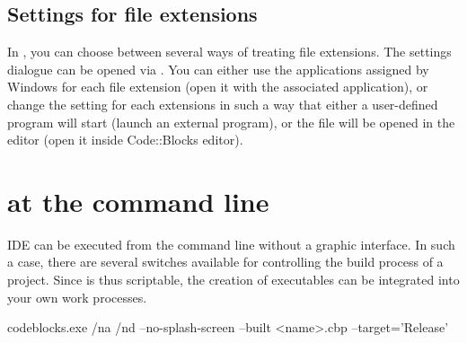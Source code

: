 \subsection{Settings for file extensions}\label{sec:file_extension}

In \codeblocks, you can choose between several ways of treating file extensions. The settings dialogue can be opened via .
You can either use the applications assigned by Windows for each file extension (open it with the associated application), or change the setting for each extensions in such a way that either a user-defined program will start (launch an external program), or the file will be opened in the \codeblocks editor (open it inside Code::Blocks editor).


\section{\codeblocks at the command line}

IDE \codeblocks can be executed from the command line without a graphic interface. In such a case, there are several switches available for controlling the build process of a project. Since \codeblocks is thus scriptable, the creation of executables can be integrated into your own work processes.

\begin{cmd}
codeblocks.exe /na /nd --no-splash-screen --built <name>.cbp --target='Release'
\end{cmd}

